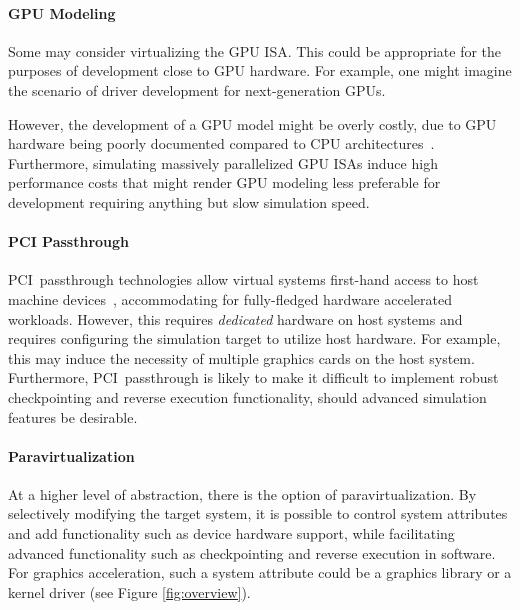 \paragraph{GPU Modeling}
\label{par:previousresearch_graphicsvirtualization_gpumodeling}
Some may consider virtualizing the GPU ISA.
This could be appropriate for the purposes of development close to GPU hardware.
For example, one might imagine the scenario of driver development for next-generation GPUs.

However, the development of a GPU model might be overly costly, due to GPU hardware being poorly documented compared to CPU architectures~.
Furthermore, simulating massively parallelized GPU ISAs induce high performance costs that might render GPU modeling less preferable for development requiring anything but slow simulation speed.

\paragraph{PCI Passthrough}
\label{par:previousresearch_graphicsvirtualization_pcipassthrough}
PCI~passthrough technologies allow virtual systems first-hand access to host machine devices~, accommodating for fully-fledged hardware accelerated workloads.
However, this requires \textit{dedicated} hardware on host systems and requires configuring the simulation target to utilize host hardware.
For example, this may induce the necessity of multiple graphics cards on the host system.
Furthermore, PCI~passthrough is likely to make it difficult to implement robust checkpointing and reverse execution functionality, should advanced simulation features be desirable.

\paragraph{Paravirtualization}
\label{par:previousresearch_graphicsvirtualization_paravirtualization}
At a higher level of abstraction, there is the option of paravirtualization.
By selectively modifying the target system, it is possible to control system attributes and add functionality such as device hardware support, while facilitating advanced functionality such as checkpointing and reverse execution in software.
For graphics acceleration, such a system attribute could be a graphics library or a kernel driver (see Figure \ref{fig:overview}).

